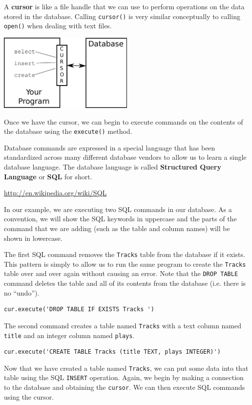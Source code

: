 \documentclass[11pt]{book}
\begin{document}
A {\bf cursor} is like a file handle that we can use to perform
operations on the data stored in the database.  Calling 
{\tt cursor()} is very similar conceptually to calling
{\tt open()} when dealing with text files.

\beforefig
\centerline{\includegraphics[height=1.50in]{figs2/cursor.eps}}
\afterfig

Once we have the cursor, we can begin to execute 
commands on the contents of the database using the {\tt execute()}
method.

Database commands are expressed in a special language that has 
been standardized across many different database vendors 
to allow us to learn a single database language.   The database
language is called {\bf Structured Query Language} or {\bf SQL}
for short.

\url{http://en.wikipedia.org/wiki/SQL}

In our example, we are executing two SQL commands in our database.
As a convention, we will show the SQL keywords in uppercase 
and the parts of the command that we are adding (such as the
table and column names) will be shown in lowercase.

The first SQL command removes the {\tt Tracks} table from the 
database if it exists.  This pattern is simply to allow us to 
run the same program to create the {\tt Tracks} table over 
and over again without causing an error.  Note that the
{\tt DROP TABLE} command deletes the table and all of its contents
from the database (i.e. there is no ``undo'').

\beforeverb
\begin{verbatim}
cur.execute('DROP TABLE IF EXISTS Tracks ')
\end{verbatim}
\afterverb
%
The second command creates a table named
{\tt Tracks} with a text column named {\tt title}
and an integer column named {\tt plays}.

\beforeverb
\begin{verbatim}
cur.execute('CREATE TABLE Tracks (title TEXT, plays INTEGER)')
\end{verbatim}
\afterverb
%
Now that we have created a table named {\tt Tracks}, we can put some data
into that table using the SQL {\tt INSERT} operation.   Again, we begin
by making a connection to the database and obtaining the {\tt cursor}.
We can then execute SQL commands using the cursor.
\end{document}

